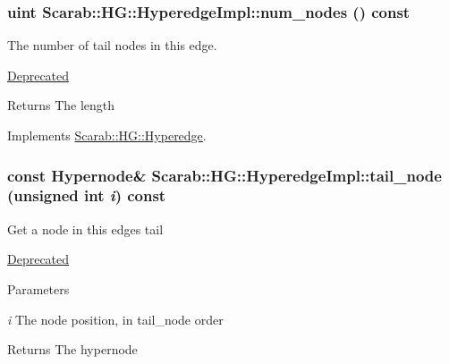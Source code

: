 \hypertarget{class_scarab_1_1_h_g_1_1_hyperedge_impl_a9a5bef8789c9c7caee6f53833ea4acc7}{
\subsubsection[{num\_\-nodes}]{\setlength{\rightskip}{0pt plus 5cm}uint Scarab::HG::HyperedgeImpl::num\_\-nodes () const}}
\label{class_scarab_1_1_h_g_1_1_hyperedge_impl_a9a5bef8789c9c7caee6f53833ea4acc7}
The number of tail nodes in this edge. \begin{Desc}
\item[\hyperlink{deprecated__deprecated000004}{Deprecated}]\end{Desc}
\begin{DoxyReturn}{Returns}
The length 
\end{DoxyReturn}


Implements \hyperlink{class_scarab_1_1_h_g_1_1_hyperedge_a799d8d98242c129d7eee178bdf1fb535}{Scarab::HG::Hyperedge}.

\hypertarget{class_scarab_1_1_h_g_1_1_hyperedge_impl_a7087ba121f3056eb5946d1909c4b3d58}{
\subsubsection[{tail\_\-node}]{\setlength{\rightskip}{0pt plus 5cm}const {\bf Hypernode}\& Scarab::HG::HyperedgeImpl::tail\_\-node (unsigned int {\em i}) const}}
\label{class_scarab_1_1_h_g_1_1_hyperedge_impl_a7087ba121f3056eb5946d1909c4b3d58}
Get a node in this edges tail \begin{Desc}
\item[\hyperlink{deprecated__deprecated000003}{Deprecated}]\end{Desc}

\begin{DoxyParams}{Parameters}
\item[{\em i}]The node position, in tail\_\-node order\end{DoxyParams}
\begin{DoxyReturn}{Returns}
The hypernode 
\end{DoxyReturn}


